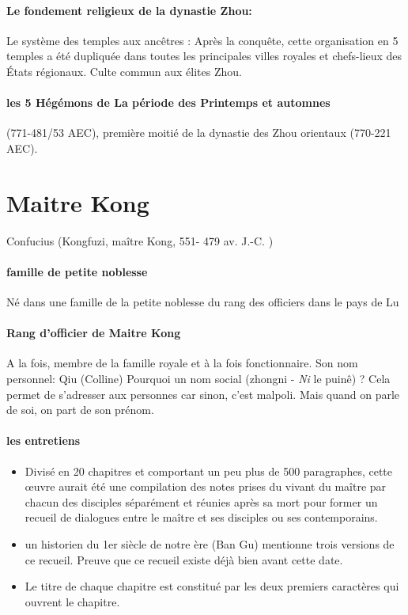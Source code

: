 \paragraph{Le fondement religieux de la dynastie Zhou:}

Le système des temples aux ancêtres :
Après la conquête, cette organisation en 5 temples a été dupliquée dans toutes les principales villes royales et chefs-lieux des États régionaux.
Culte commun aux élites Zhou.


\paragraph{les 5 Hégémons de La période des Printemps et automnes}  (771-481/53 AEC), première moitié de la dynastie des Zhou orientaux (770-221 AEC).


\section{Maitre Kong}
Confucius (Kongfuzi, maître Kong, 551- 479 av. J.-C. )

\paragraph{famille de petite noblesse}Né dans une famille de la petite noblesse du rang des officiers dans le pays de Lu
\paragraph{Rang d'officier de Maitre Kong} A la fois, membre de la famille royale et à la fois fonctionnaire. Son nom personnel: Qiu (Colline)
Pourquoi un nom social (zhongni - \textit{Ni} le puinê) ? Cela permet de s'adresser aux personnes car sinon, c'est malpoli.
Mais quand on parle de soi, on part de son prénom.


\paragraph{les entretiens}
\begin{itemize}
    \item  	Divisé en 20 chapitres et comportant un peu plus de 500 paragraphes, cette œuvre aurait été une compilation des notes prises du vivant du maître par chacun des disciples séparément et réunies après sa mort pour former un recueil de dialogues entre le maître et ses disciples ou ses contemporains.
    \item 	un historien du 1er siècle de notre ère (Ban Gu) mentionne trois versions de ce recueil. Preuve que ce recueil existe déjà bien avant cette date.
    \item 	Le titre de chaque chapitre est constitué par les deux premiers caractères qui ouvrent le chapitre.
\end{itemize}



